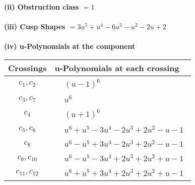 \documentclass[1p]{elsarticle_modified}
\theoremstyle{definition}
\begin{document}
\flushleft \textbf{(ii) Obstruction class $= 1$}\\~\\
\flushleft \textbf{(iii) Cusp Shapes $= 3 u^5+u^4-6 u^3- u^2-2 u+2$}\\~\\
\newpage\renewcommand{\arraystretch}{1}
\flushleft \textbf{(iv) u-Polynomials at the component}\newline \\
\begin{tabular}{m{50pt}|m{274pt}}
Crossings & \hspace{64pt}u-Polynomials at each crossing \\
\hline $$\begin{aligned}c_{1},c_{2}\end{aligned}$$&$\begin{aligned}
&(u-1)^6
\end{aligned}$\\
\hline $$\begin{aligned}c_{3},c_{7}\end{aligned}$$&$\begin{aligned}
&u^6
\end{aligned}$\\
\hline $$\begin{aligned}c_{4}\end{aligned}$$&$\begin{aligned}
&(u+1)^6
\end{aligned}$\\
\hline $$\begin{aligned}c_{5},c_{6}\end{aligned}$$&$\begin{aligned}
&u^6+u^5-3 u^4-2 u^3+2 u^2- u-1
\end{aligned}$\\
\hline $$\begin{aligned}c_{8}\end{aligned}$$&$\begin{aligned}
&u^6- u^5+3 u^4-2 u^3+2 u^2- u-1
\end{aligned}$\\
\hline $$\begin{aligned}c_{9},c_{10}\end{aligned}$$&$\begin{aligned}
&u^6- u^5-3 u^4+2 u^3+2 u^2+u-1
\end{aligned}$\\
\hline $$\begin{aligned}c_{11},c_{12}\end{aligned}$$&$\begin{aligned}
&u^6+u^5+3 u^4+2 u^3+2 u^2+u-1
\end{aligned}$\\
\hline
\end{tabular}\\~\\
\end{document}
